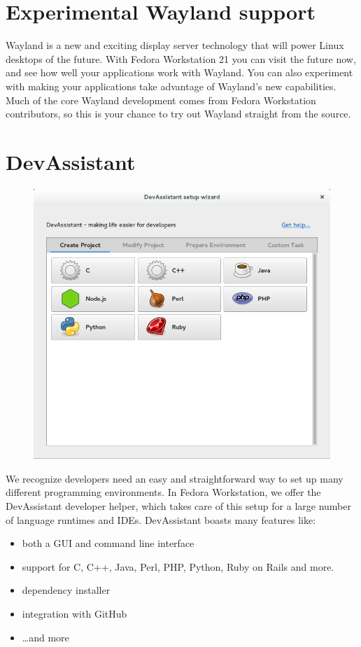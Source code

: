 \documentclass[
10pt
]{leaflet}
\begin{document}
\section{\textcolor{FedoraBlue}{Experimental Wayland support}}
Wayland is a new and exciting display server technology that will power Linux desktops of the future. With Fedora Workstation 21 you can visit the future now, and see how well your applications work with Wayland. You can also experiment with making your applications take advantage of Wayland's new capabilities. Much of the core Wayland development comes from Fedora Workstation contributors, so this is your chance to try out Wayland straight from the source.



\section{\textcolor{FedoraBlue}{DevAssistant}}
\begin{figure}[h]
  \includegraphics[keepaspectratio,width=\textwidth]{Fedora_devassistant-cropped.png}
\end{figure}
We recognize developers need an easy and straightforward way to set up many different programming environments. In Fedora Workstation, we offer the DevAssistant developer helper, which takes care of this setup for a large number of language runtimes and IDEs. DevAssistant boasts many features like:
\begin{itemize}
  \item both a GUI and command line interface
  \item support for C, C++, Java, Perl, PHP, Python, Ruby on Rails and more.
  \item dependency installer
  \item integration with GitHub
  \item \ldots and more
\end{itemize}
\end{document}
